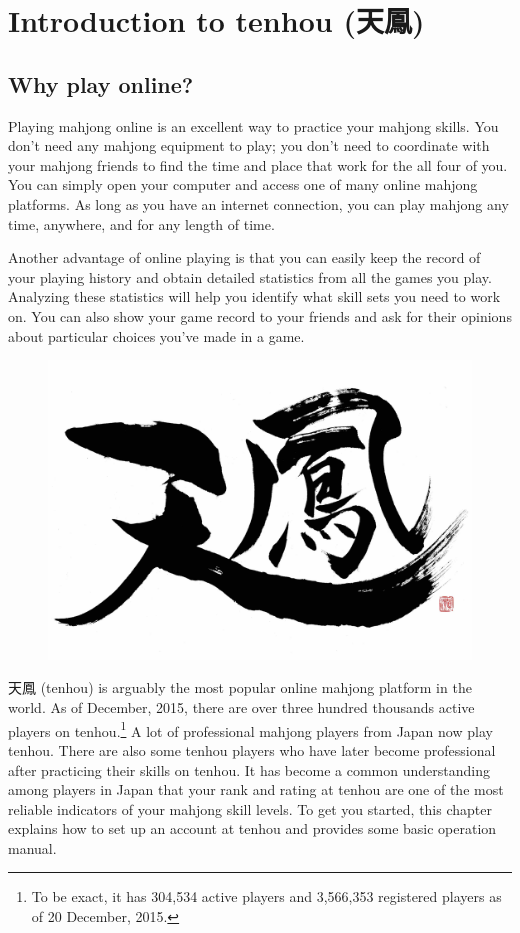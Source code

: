 
\chapter{Introduction to {\jap tenhou} (天鳳)} \label{ch:tenhou}

\section{Why play online?}

Playing mahjong online is an excellent way to practice your mahjong skills. You don't need any mahjong equipment to play; you don't need to coordinate with your mahjong friends to find the time and place that work for the all four of you. You can simply open your computer and access one of many online mahjong platforms. As long as you have an internet connection, you can play mahjong any time, anywhere, and for any length of time. 

\bigskip
Another advantage of online playing is that you can easily keep the record of your playing history and obtain detailed statistics from all the games you play. Analyzing these statistics will help you identify what skill sets you need to work on. You can also show your game record to your friends and ask for their opinions about particular choices you've made in a game. 

\begin{figure}
\vspace{-20pt}
\begin{center}
\includegraphics[width=.43\textwidth,clip]{figs/tenhou_logo_raw_wb}
\end{center}
\vspace{-20pt}
\end{figure}

\bigskip

天鳳 ({\jap tenhou}) is arguably the most popular online mahjong platform in the world. As of December, 2015, there are over three hundred thousands active players on {\jap tenhou}.\footnote{To be exact, it has 304,534 active players and 3,566,353 registered players as of 20 December, 2015.} A lot of professional mahjong players from Japan now play {\jap tenhou}. There are also some {\jap tenhou} players who have later become professional after practicing their skills on {\jap tenhou}. It has become a common understanding among players in Japan that your rank and rating at {\jap tenhou} are one of the most reliable indicators of your mahjong skill levels. 
To get you started, this chapter explains how to set up an account at {\jap tenhou} and provides some basic operation manual. 

